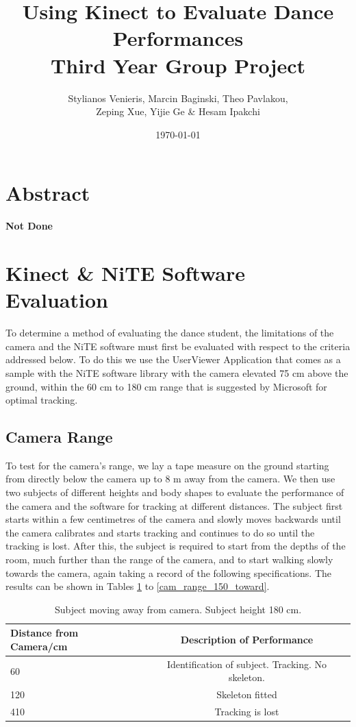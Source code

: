 \documentclass[a4paper]{article}
\begin{document}
\title{Using Kinect to Evaluate Dance Performances\\ Third Year Group Project}
\author{Stylianos Venieris, Marcin Baginski, Theo Pavlakou, \\Zeping Xue, Yijie Ge \& Hesam Ipakchi  }
\date{\today}
\maketitle
{}
\newpage

\setcounter{page}{1}
\section*{\center Abstract}
\textbf{Not Done}

\section{Kinect \& NiTE Software Evaluation}
\noindent
To determine a method of evaluating the dance student, the limitations of the camera and the NiTE software must first be evaluated with respect to the criteria addressed below. To do this we use the UserViewer Application that comes as a sample with the NiTE software library with the camera elevated 75 cm above the ground, within the 60 cm to 180 cm range that is suggested by Microsoft for optimal tracking. 

\subsection{Camera Range}
\noindent 
To test for the camera's range, we lay a tape measure on the ground starting from directly below the camera up to 8 m away from the camera. We then use two subjects of different heights and body shapes to evaluate the performance of the camera and the software for tracking at different distances. The subject first starts within a few centimetres of the camera and slowly moves backwards until the camera calibrates and starts tracking and continues to do so until the tracking is lost. After this, the subject is required to start from the depths of the room, much further than the range of the camera, and to start walking slowly towards the camera, again taking a record of the following specifications. The results can be shown in Tables \ref{cam_range_180_away} to \ref{cam_range_150_toward}.
\\
\begin{table}[h]
\center
\begin{tabular}{ | l | c |}
\hline
Distance from Camera/cm & Description of Performance \\
\hline
60 & Identification of subject. Tracking. No skeleton.\\
120 & Skeleton fitted\\
410 & Tracking is lost\\
\hline
\end{tabular}
\caption{Subject moving away from camera. Subject height 180 cm.}
\label{cam_range_180_away}
\end{table}
\end{document}

